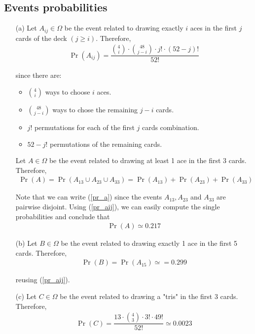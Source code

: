 \subsection{Events probabilities}
\begin{itemize}
	\item[(a)] Let $A_{ij} \in \Omega$ be the event related to drawing exactly $i$ aces in the first $j$ cards of the deck $(j \geq i)$. Therefore,
	\begin{align}
		\Pr(A_{ij}) = \dfrac{\binom{4}{i} \cdot \binom{48}{j-i} \cdot j! \cdot (52-j)!}{52!} \label{pr_aij}
	\end{align}
	
	since there are:
	\begin{itemize}
		\item $\binom{4}{i}$ ways to choose $i$ aces.
		\item $\binom{48}{j-i}$ ways to chose the remaining $j-i$ cards.
		\item $j!$ permutations for each of the first $j$ cards combination.
		\item $52-j!$ permutations of the remaining cards.
	\end{itemize}
	
	Let $A \in \Omega$ be the event related to drawing at least 1 ace in the first 3 cards. Therefore,
	\begin{align}
		\Pr(A) = \Pr(A_{13} \cup A_{23} \cup A_{33}) = \Pr(A_{13}) + \Pr(A_{23}) + \Pr(A_{33}) \label{pr_a}
	\end{align}
	
	Note that we can write (\ref{pr_a}) since the events $A_{13}, A_{23}$ and $A_{33}$ are pairwise disjoint. Using (\ref{pr_aij}), we can easily compute the single probabilities and conclude that
	\begin{align*}
		\Pr(A) \simeq 0.217
	\end{align*}
	
	\item[(b)] Let $B \in \Omega$ be the event related to drawing exactly 1 ace in the first 5 cards. Therefore,
	\begin{align*}
		\Pr(B) = \Pr(A_{15}) \simeq= 0.299
	\end{align*}
	
	reusing (\ref{pr_aij}).
	
	\item[(c)] Let $C \in \Omega$ be the event related to drawing a "tris" in the first 3 cards. Therefore,
	\begin{align*}
		\Pr(C) = \dfrac{13 \cdot \binom{4}{3} \cdot 3! \cdot 49!}{52!} \simeq 0.0023
	\end{align*}
	

\end{itemize}
